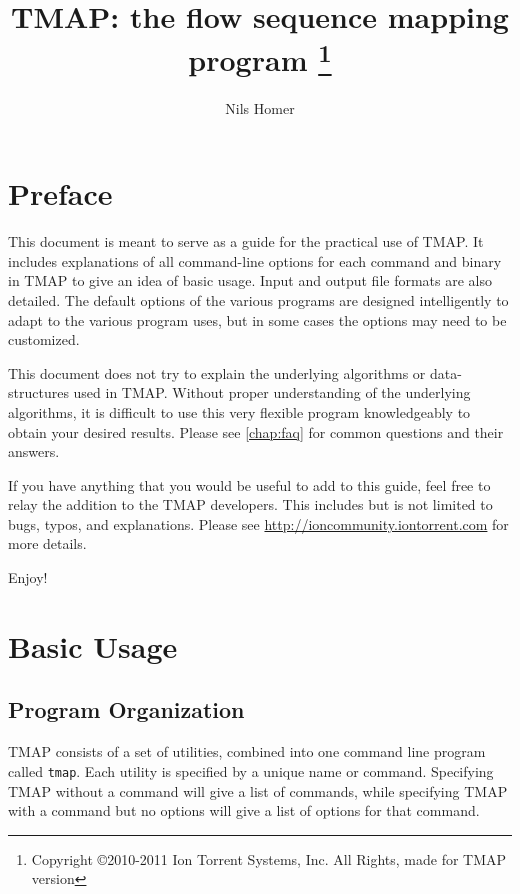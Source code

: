 \documentclass[a4paper,12pt]{book}
\author{Nils Homer}
\date{}
\title{TMAP: the flow sequence mapping program
\thanks{Copyright \copyright 2010-2011 Ion Torrent Systems, Inc. All Rights, made for TMAP version \Version}
}
\newcommand{\TT}[1]{{\tt #1}} %
\begin{document}
\frontmatter

\maketitle

\tableofcontents
{}


\chapter{Preface}
This document is meant to serve as a guide for the practical use of TMAP.
It includes explanations of all command-line options for each command and binary in TMAP to give an idea of basic usage.
Input and output file formats are also detailed.
The default options of the various programs are designed intelligently to adapt to the various program uses, but in some cases the options may need to be customized.

This document does not try to explain the underlying algorithms or data-structures used in TMAP.
Without proper understanding of the underlying algorithms, it is difficult to use this very flexible program knowledgeably to obtain your desired results.
Please see \autoref{chap:faq} for common questions and their answers.

If you have anything that you would be useful to add to this guide, feel free to relay the addition to the TMAP developers.
This includes but is not limited to bugs, typos, and explanations.
Please see \url{http://ioncommunity.iontorrent.com} for more details.

Enjoy!

\mainmatter

\chapter{Basic Usage}

\section{Program Organization}
TMAP consists of a set of utilities, combined into one command line program called \TT{tmap}.  
Each utility is specified by a unique name or command.
Specifying TMAP without a command will give a list of commands, while specifying TMAP with a command but no options will give a list of options for that command.
\end{document}
